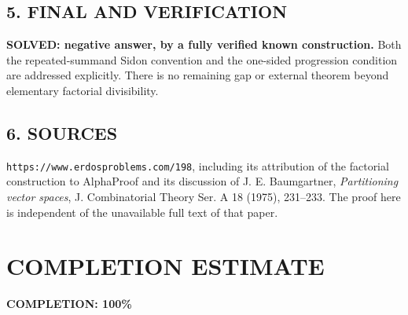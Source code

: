 \subsection*{5. FINAL AND VERIFICATION}
\textbf{SOLVED: negative answer, by a fully verified known construction.}
Both the repeated-summand Sidon convention and the one-sided progression condition are addressed explicitly. There is no remaining gap or external theorem beyond elementary factorial divisibility.
\subsection*{6. SOURCES}
\texttt{https://www.erdosproblems.com/198}, including its attribution of the factorial construction to AlphaProof and its discussion of J. E. Baumgartner, \emph{Partitioning vector spaces}, J. Combinatorial Theory Ser. A 18 (1975), 231--233. The proof here is independent of the unavailable full text of that paper.
\section{COMPLETION ESTIMATE}
\textbf{COMPLETION: 100\%}
